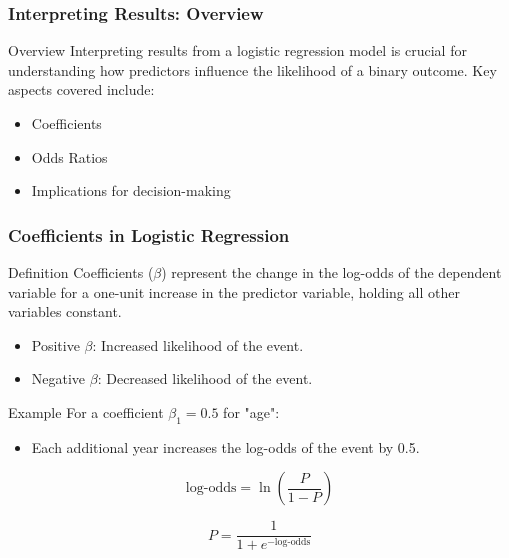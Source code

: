 \documentclass[aspectratio=169]{beamer}
\begin{document}
\begin{frame}[fragile]
    \frametitle{Interpreting Results: Overview}
    \begin{block}{Overview}
        Interpreting results from a logistic regression model is crucial for understanding how predictors influence the likelihood of a binary outcome. Key aspects covered include:
    \end{block}
    \begin{itemize}
        \item Coefficients
        \item Odds Ratios
        \item Implications for decision-making
    \end{itemize}
\end{frame}

\begin{frame}[fragile]
    \frametitle{Coefficients in Logistic Regression}
    \begin{block}{Definition}
        Coefficients ($\beta$) represent the change in the log-odds of the dependent variable for a one-unit increase in the predictor variable, holding all other variables constant.
    \end{block}
    \begin{itemize}
        \item Positive $\beta$: Increased likelihood of the event.
        \item Negative $\beta$: Decreased likelihood of the event.
    \end{itemize}
    
    \begin{block}{Example}
        For a coefficient $\beta_1 = 0.5$ for "age":
        \begin{itemize}
            \item Each additional year increases the log-odds of the event by 0.5.
        \end{itemize}
    \end{block}

    \begin{equation}
        \text{log-odds} = \ln\left(\frac{P}{1-P}\right)
    \end{equation}

    \begin{equation}
        P = \frac{1}{1 + e^{-\text{log-odds}}}
    \end{equation}
\end{frame}
\end{document}
